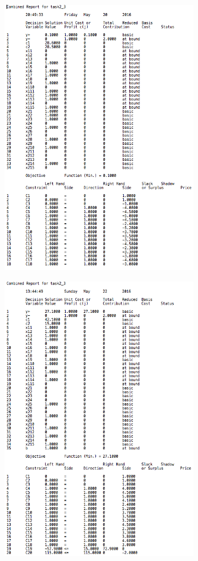 \documentclass[10pt, a4paper]{article}
\begin{document}
		\begin{figure}[H]
		\centering
			\includegraphics[width=0.75\textwidth]{res/exercise-3-result.png}
		\end{figure}

		\begin{figure}[H]
		\centering
			\includegraphics[width=0.75\textwidth]{res/exercise-3-c-result.png}
		\end{figure}
\end{document}
